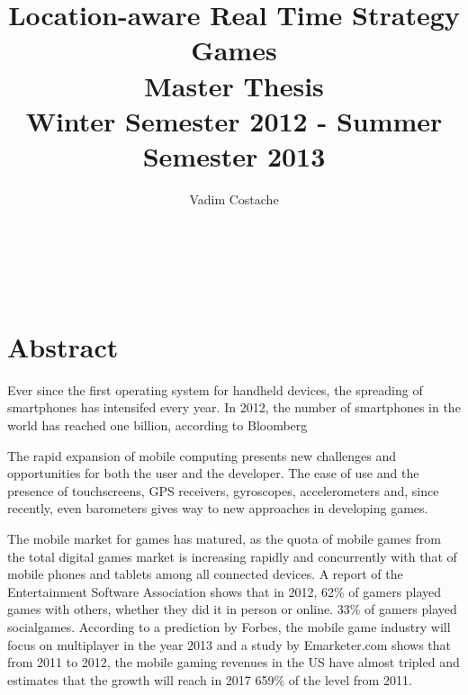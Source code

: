 \documentclass{article}
\title{Location-aware Real Time Strategy Games \\ Master Thesis \\
Winter Semester 2012 - Summer Semester 2013}
\author{Vadim Costache} %
\begin{document}
\maketitle %

\setlength\parindent{0pt} %

\renewcommand{\labelenumi}{\alph{enumi}.} %

\newcommand{\superscript}[1]{\ensuremath{^{\textrm{#1}}}}
\newcommand{\subscript}[1]{\ensuremath{_{\textrm{#1}}}}



   
\begin{verbatim}



\end{verbatim}
     
\tableofcontents

\newpage


\section{Abstract}

Ever since the first operating system for handheld devices, the spreading of
smartphones has intensifed every year. In 2012, the number of smartphones in the
world has reached one billion, according to Bloomberg\cite{bloomberg} \newline

The rapid expansion of mobile computing presents new challenges and
opportunities for both the user and the developer. The ease of use and the
presence of touchscreens, GPS receivers, gyroscopes, accelerometers and, since
recently, even barometers gives way to new approaches in developing
games.\newline

The mobile market for games has matured, as the quota of mobile games from the
total digital games market is increasing rapidly and concurrently with that of
mobile phones and tablets among all connected devices. A report of the
Entertainment Software Association shows that in 2012, 62\% of gamers played
games with others, whether they did it in person or online. 33\% of gamers
played socialgames\cite{esa}. According to a prediction by Forbes, the mobile
game industry will focus on multiplayer in the year 2013\cite{forbes}
and a study by Emarketer.com shows that from 2011 to 2012, the mobile
gaming revenues in the US have almost tripled and estimates that the
growth will reach in 2017 659\% of the level from 2011\cite{emarketer}.\newline
\end{document}

